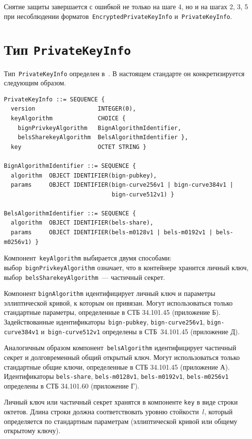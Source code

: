 Снятие защиты завершается с ошибкой не только на шаге 4, но и на 
шагах 2, 3, 5 при несоблюдении форматов~\texttt{EncryptedPrivateKeyInfo} 
и~\texttt{PrivateKeyInfo}. 

\section{Тип \texttt{PrivateKeyInfo}}\label{CONT.PT}

Тип~\texttt{PrivateKeyInfo} определен в~\cite{PKCS8}.
В настоящем стандарте он конкретизируется следующим образом.

\begin{verbatim}
PrivateKeyInfo ::= SEQUENCE {
  version                  INTEGER(0),
  keyAlgorithm             CHOICE {
    bignPrivkeyAlgorithm   BignAlgorithmIdentifier,
    belsSharekeyAlgorithm  BelsAlgorithmIdentifier },
  key                      OCTET STRING }

BignAlgorithmIdentifier ::= SEQUENCE {
  algorithm  OBJECT IDENTIFIER(bign-pubkey),
  params     OBJECT IDENTIFIER(bign-curve256v1 | bign-curve384v1 | 
                               bign-curve512v1) }

BelsAlgorithmIdentifier ::= SEQUENCE {
  algorithm  OBJECT IDENTIFIER(bels-share),
  params     OBJECT IDENTIFIER(bels-m0128v1 | bels-m0192v1 | bels-m0256v1) }
\end{verbatim}

Компонент~\texttt{keyAlgorithm} выбирается двумя способами:
выбор~\texttt{bignPrivkeyAlgorithm} означает, что в контейнере хранится личный 
ключ, выбор~\texttt{belsSharekeyAlgorithm}~--- частичный секрет. 

Компонент \texttt{bignAlgorithm} идентифицирует личный ключ и параметры 
эллиптической кривой, к которым он привязан. Могут использоваться
только стандартные параметры, определенные в СТБ 34.101.45 (приложение Б). 
%
Задействованные идентификаторы~\texttt{bign-pubkey}, 
\texttt{bign-curve256v1}, \texttt{bign-curve384v1} 
и~\texttt{bign-curve512v1} определены в СТБ~34.101.45 (приложение Д).

Аналогичным образом компонент~\texttt{belsAlgorithm} идентифицирует 
частичный секрет и долговременный общий открытый ключ. 
Могут использоваться только стандартные общие ключи, 
определенные в СТБ 34.101.45 (приложение А). 
Идентификаторы \texttt{bels-share}, \texttt{bels-m0128v1}, 
\texttt{bels-m0192v1}, \texttt{bels-m0256v1} определены в СТБ 34.101.60 
(приложение Г).

Личный ключ или частичный секрет хранятся в компоненте \texttt{key}
в виде строки октетов. Длина строки должна соответствовать уровню
стойкости~$l$, который определяется по стандартным параметрам
(эллиптической кривой или общему открытому ключу).

